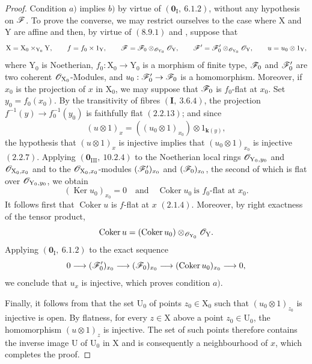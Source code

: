 \begin{proof}
Condition $a)$ implies $b)$ by virtue of $(\mathbf{0}_\mathrm{I},~6.1.2)$, without any hypothesis on $\mathscr{F}$. To prove the converse, we may restrict ourselves to the case where $\mathrm{X}$ and $\mathrm{Y}$ are affine and then, by virtue of $(8.9.1)$ and , suppose that
\[
  \mathrm{X}=\mathrm{X}_0\times_{\mathrm{Y}_0}\mathrm{Y},\qquad
  f=f_0\times 1_\mathrm{Y},\qquad
  \mathscr{F}=\mathscr{F}_0\otimes_{\mathscr{O}_{\mathrm{Y}_0}}\mathscr{O}_\mathrm{Y},\qquad
  \mathscr{F}'=\mathscr{F}'_0\otimes_{\mathscr{O}_{\mathrm{Y}_0}}\mathscr{O}_\mathrm{Y},\qquad
  u=u_0\otimes 1_\mathrm{Y},
\]
where $\mathrm{Y}_0$ is Noetherian, $f_0:\mathrm{X}_0\to\mathrm{Y}_0$ is a morphism of finite type, $\mathscr{F}_0$ and $\mathscr{F}'_0$ are two coherent $\mathscr{O}_{\mathrm{X}_0}$-Modules, and $u_0:\mathscr{F}'_0\to\mathscr{F}_0$ is a homomorphism. Moreover, if $x_0$ is the projection of $x$ in $\mathrm{X}_0$, we may suppose that $\mathscr{F}_0$ is $f_0$-flat at $x_0$. Set $y_0=f_0(x_0)$. By the transitivity of fibres $(\mathbf{I},~3.6.4)$, the projection $f^{-1}(y)\to f_0^{-1}(y_0)$ is faithfully flat $(2.2.13)$; and since
\[
  (u\otimes 1)_x=((u_0\otimes 1)_{x_0})\otimes 1_{\boldsymbol{k}(y)},
\]
the hypothesis that $(u\otimes 1)_x$ is injective implies that $(u_0\otimes 1)_{x_0}$ is injective $(2.2.7)$. Applying $(\mathbf{0}_{\mathrm{III}},~10.2.4)$ to the Noetherian local rings $\mathscr{O}_{\mathrm{Y}_0,y_0}$ and $\mathscr{O}_{\mathrm{X}_0,x_0}$ and to the $\mathscr{O}_{\mathrm{X}_0,x_0}$-modules $(\mathscr{F}'_0)_{x_0}$ and $(\mathscr{F}_0)_{x_0}$, the second of which is flat over $\mathscr{O}_{\mathrm{Y}_0,y_0}$, we obtain
\[
  (\operatorname{Ker}u_0)_{x_0}=0
  \quad\text{and}\quad
  \operatorname{Coker}u_0\ \text{is $f_0$-flat at }x_0.
\]
It follows first that $\operatorname{Coker}u$ is $f$-flat at $x$ $(2.1.4)$. Moreover, by right exactness of the tensor product,
\[
  \operatorname{Coker}u=(\operatorname{Coker}u_0)
  \otimes_{\mathscr{O}_{\mathrm{Y}_0}}\mathscr{O}_\mathrm{Y}.
\]
Applying $(\mathbf{0}_\mathrm{I},~6.1.2)$ to the exact sequence
\[
  0\longrightarrow(\mathscr{F}'_0)_{x_0}
  \longrightarrow(\mathscr{F}_0)_{x_0}
  \longrightarrow(\operatorname{Coker}u_0)_{x_0}
  \longrightarrow0,
\]
we conclude that $u_x$ is injective, which proves condition $a)$.

Finally, it follows from  that the set $\mathrm{U}_0$ of points $z_0\in\mathrm{X}_0$ such that $(u_0\otimes 1)_{z_0}$ is injective is open. By flatness, for every $z\in\mathrm{X}$ above a point $z_0\in\mathrm{U}_0$, the homomorphism $(u\otimes 1)_z$ is injective. The set of such points therefore contains the inverse image $\mathrm{U}$ of $\mathrm{U}_0$ in $\mathrm{X}$ and is consequently a neighbourhood of $x$, which completes the proof.
\end{proof}

